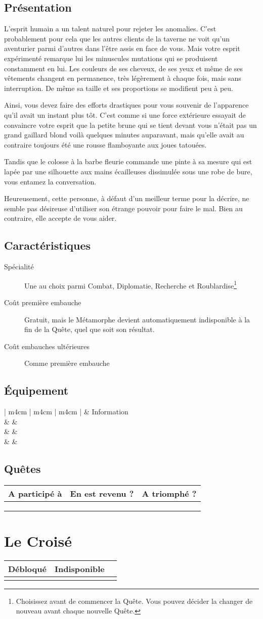 \documentclass{report}
\newcommand{\herostats}[4]{
    \section{Présentation}

    #1

    \section{Caractéristiques}

    \begin{description}
        \item[Spécialité] #2
        \item[Coût première embauche] #3
        \item[Coût embauches ultérieures] #4
    \end{description}
}
\newcommand{\herosheet}{
    \section{Équipement}

    \begin{tabular}{ | m{4cm} | m{4cm} | m{4cm} | }
        \hline
        \multicolumn{2}{| m{8cm} |}{Équipement} & Information\\
        \hline
        \mytextfield{4cm} & \mytextfield{4cm} & \mytextfield{4cm}\\
        \hline
        \mytextfield{4cm} & \mytextfield{4cm} & \mytextfield{4cm}\\
        \hline
        \mytextfield{4cm} & \mytextfield{4cm} & \mytextfield{4cm}\\
        \hline
    \end{tabular}

    \section{Quêtes}

    \begin{tabular}{ | m{7cm} | m{2.5cm} | m{2.5cm} |}
        \hline
        A participé à & En est revenu ? & A triomphé ?\\
        \hline
        \mytextfield{7cm} & \mycheckbox & \mycheckbox \\ 
        \hline
        \mytextfield{7cm} & \mycheckbox & \mycheckbox \\ 
        \hline
        \mytextfield{7cm} & \mycheckbox & \mycheckbox \\ 
        \hline
    \end{tabular}
}
\newcommand{\picturelesshero}[4]{
    \herostats{#1}{#2}{#3}{#4}

    \clearpage

    \herosheet
}
\newcommand{\lockedhero}{
\begin{tabular}{ | m{4cm} | m{4cm} | m{4cm} | }
    \hline
    Débloqué & Indisponible\\
    \hline
    \mycheckbox & \mycheckbox \\
    \hline
\end{tabular}
}
\begin{document}
\picturelesshero{
L'esprit humain a un talent naturel pour rejeter les anomalies. C'est probablement pour cela que les autres clients de la taverne ne voit qu'un aventurier parmi d'autres dans l'être assis en face de vous. Mais votre esprit expérimenté remarque lui les minuscules mutations qui se produisent constamment en lui. Les couleurs de ses cheveux, de ses yeux et même de ses vêtements changent en permanence, très légèrement à chaque fois, mais sans interruption. De même sa taille et ses proportions se modifient peu à peu.

Ainsi, vous devez faire des efforts drastiques pour vous souvenir de l'apparence qu'il avait un instant plus tôt. C'est comme si une force extérieure essayait de convaincre votre esprit que la petite brune qui se tient devant vous n'était pas un grand gaillard blond voilà quelques minutes auparavant, mais qu'elle avait au contraire toujours été une rousse flamboyante aux joues tatouées.

Tandis que le colosse à la barbe fleurie commande une pinte à sa mesure qui est lapée par une silhouette aux mains écailleuses dissimulée sous une robe de bure, vous entamez la conversation.

Heureusement, cette personne, à défaut d'un meilleur terme pour la décrire, ne semble pas désireuse d'utiliser son étrange pouvoir pour faire le mal. Bien au contraire, elle accepte de vous aider.
}{
Une au choix parmi Combat, Diplomatie, Recherche et Roublardise\footnote{Choisissez avant de commencer la Quête. Vous pouvez décider la changer de nouveau avant chaque nouvelle Quête.}
}{
Gratuit, mais le Métamorphe devient automatiquement indisponible à la fin de la Quête, quel que soit son résultat.
}{
Comme première embauche
}

\chapter{Le Croisé}

\lockedhero
\end{document}
